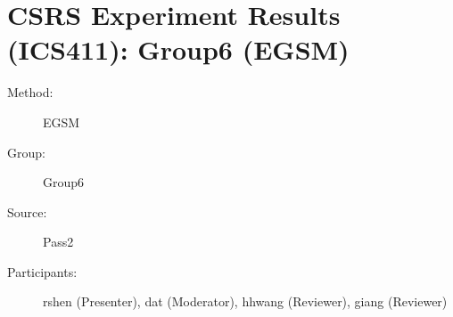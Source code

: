 \chapter {CSRS Experiment Results (ICS411): Group6 (EGSM)}
\small
	  

\begin{description}
\item [Method:] EGSM
\item [Group:] Group6
\item [Source:] Pass2
\item [Participants:] rshen (Presenter), dat (Moderator), hhwang (Reviewer), giang (Reviewer)
\end{description}
